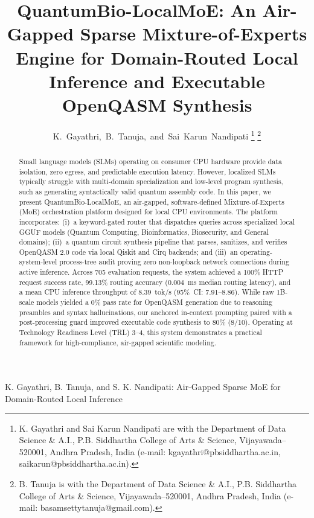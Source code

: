 \documentclass[journal]{IEEEtran}
\begin{document}
\title{QuantumBio-LocalMoE: An Air-Gapped Sparse Mixture-of-Experts Engine for
Domain-Routed Local Inference and Executable OpenQASM Synthesis}

\author{K.~Gayathri,~B.~Tanuja,~and~Sai~Karun~Nandipati
\thanks{K. Gayathri and Sai Karun Nandipati are with the Department of Data
Science \& A.I., P.B. Siddhartha College of Arts \& Science, Vijayawada--520001,
Andhra Pradesh, India (e-mail: kgayathri@pbsiddhartha.ac.in,
saikarun@pbsiddhartha.ac.in).}
\thanks{B. Tanuja is with the Department of Data Science \& A.I., P.B.
Siddhartha College of Arts \& Science, Vijayawada--520001, Andhra Pradesh, India
(e-mail: basamsettytanuja@gmail.com).}}

%
{K. Gayathri, B. Tanuja, and S. K. Nandipati: Air-Gapped Sparse MoE for
Domain-Routed Local Inference}

\maketitle

\begin{abstract}
Small language models (SLMs) operating on consumer CPU hardware provide data
isolation, zero egress, and predictable execution latency. However, localized
SLMs typically struggle with multi-domain specialization and low-level program
synthesis, such as generating syntactically valid quantum assembly code. In
this paper, we present QuantumBio-LocalMoE, an air-gapped, software-defined
Mixture-of-Experts (MoE) orchestration platform designed for local CPU
environments. The platform incorporates: (i)~a keyword-gated router that
dispatches queries across specialized local GGUF models (Quantum Computing,
Bioinformatics, Biosecurity, and General domains); (ii)~a quantum circuit
synthesis pipeline that parses, sanitizes, and verifies OpenQASM 2.0 code via
local Qiskit and Cirq backends; and (iii)~an operating-system-level process-tree
audit proving zero non-loopback network connections during active inference.
Across 705 evaluation requests, the system achieved a 100\% HTTP request success
rate, 99.13\% routing accuracy ($0.004$~ms median routing latency), and a mean
CPU inference throughput of $8.39$~tok/s (95\%~CI: 7.91--8.86). While raw
1B-scale models yielded a 0\% pass rate for OpenQASM generation due to reasoning
preambles and syntax hallucinations, our anchored in-context prompting paired
with a post-processing guard improved executable code synthesis to 80\%
(8/10). Operating at Technology Readiness Level (TRL) 3--4, this system
demonstrates a practical framework for high-compliance, air-gapped scientific
modeling.
\end{abstract}
\end{document}
